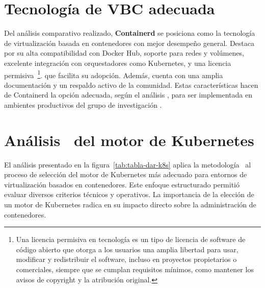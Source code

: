 \section{Tecnología de VBC adecuada}
\noindent
Del análisis comparativo realizado, \textbf{Containerd} se posiciona como la tecnología de virtualización basada en contenedores con mejor desempeño general. Destaca por su alta compatibilidad con Docker Hub, soporte para redes y volúmenes, excelente integración con orquestadores como Kubernetes, y una licencia permisiva~\footnote{Una licencia permisiva en tecnología es un tipo de licencia de software de código abierto que otorga a los usuarios una amplia libertad para usar, modificar y redistribuir el software, incluso en proyectos propietarios o comerciales, siempre que se cumplan requisitos mínimos, como mantener los avisos de copyright y la atribución original.}. que facilita su adopción. Además, cuenta con una amplia documentación y un respaldo activo de la comunidad. Estas características hacen de Containerd la opción adecuada, según el análisis \DAR, para ser implementada en ambientes productivos del grupo de investigación \GRID.
\clearpage
\section{Análisis \DAR\ del motor de Kubernetes}
\noindent
El análisis presentado en la figura~\ref{tab:tabla-dar-k8s} aplica la metodología \DAR\ al proceso de selección del motor de Kubernetes más adecuado para entornos de virtualización basados en contenedores. Este enfoque estructurado permitió evaluar diversos criterios técnicos y operativos. La importancia de la elección de un motor de Kubernetes radica en su impacto directo sobre la administración de contenedores. 
